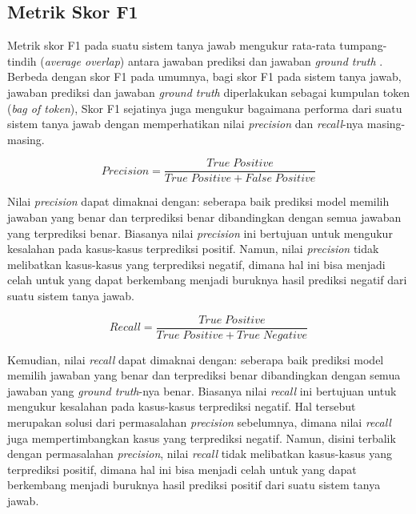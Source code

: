 \subsection{Metrik Skor F1}
Metrik skor F1  pada suatu sistem tanya jawab mengukur rata-rata tumpang-tindih (\emph{average overlap}) antara jawaban prediksi dan jawaban \emph{ground truth} \citep{rajpurkar-etal-2016-squad}. Berbeda dengan skor F1 pada umumnya, bagi \citeauthor{rajpurkar-etal-2016-squad} skor F1 pada sistem tanya jawab, jawaban prediksi dan jawaban \emph{ground truth} diperlakukan sebagai kumpulan token (\emph{bag of token}), Skor F1 sejatinya juga mengukur bagaimana performa dari suatu sistem tanya jawab dengan memperhatikan nilai \emph{precision} dan \emph{recall}-nya masing-masing. 


\begin{equation}
Precision = \frac{True \; Positive}{True \; Positive + False \; Positive}
\end{equation}

Nilai \emph{precision} dapat dimaknai dengan: seberapa baik prediksi model memilih jawaban yang benar dan terprediksi benar dibandingkan dengan semua jawaban yang terprediksi benar. Biasanya nilai \emph{precision} ini bertujuan untuk mengukur kesalahan pada kasus-kasus terprediksi positif. Namun, nilai \emph{precision} tidak melibatkan kasus-kasus yang terprediksi negatif, dimana hal ini bisa menjadi celah untuk yang dapat berkembang menjadi buruknya hasil prediksi negatif dari suatu sistem tanya jawab.

\begin{equation}
Recall = \frac{True \; Positive}{True \; Positive + True \; Negative}
\end{equation}

Kemudian, nilai \emph{recall} dapat dimaknai dengan: seberapa baik prediksi model memilih jawaban yang benar dan terprediksi benar dibandingkan dengan semua jawaban yang \emph{ground truth}-nya benar. Biasanya nilai \emph{recall} ini bertujuan untuk mengukur kesalahan pada kasus-kasus terprediksi negatif. Hal tersebut merupakan solusi dari permasalahan \emph{precision} sebelumnya, dimana nilai \emph{recall} juga mempertimbangkan kasus yang terprediksi negatif. Namun, disini terbalik dengan permasalahan \emph{precision}, nilai \emph{recall} tidak melibatkan kasus-kasus yang terprediksi positif, dimana hal ini bisa menjadi celah untuk yang dapat berkembang menjadi buruknya hasil prediksi positif dari suatu sistem tanya jawab.


